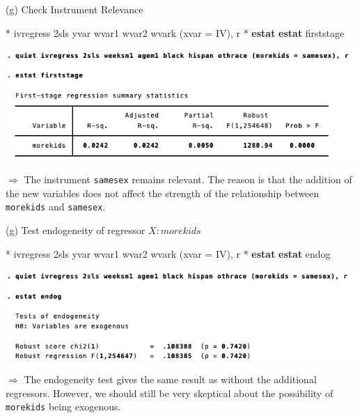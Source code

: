 \documentclass[
  10pt,
  ignorenonframetext,
]{beamer}
\newenvironment{Shaded}{\begin{snugshade}}{\end{snugshade}}
\newcommand{\FunctionTok}[1]{\textcolor[rgb]{0.00,0.00,0.00}{#1}}
\newcommand{\KeywordTok}[1]{\textcolor[rgb]{0.13,0.29,0.53}{\textbf{#1}}}
\newcommand{\NormalTok}[1]{#1}
\begin{document}
\begin{frame}[fragile]{(g) Check Instrument Relevance}
\protect\hypertarget{g-check-instrument-relevance}{}
\small

\begin{Shaded}
\begin{Highlighting}[]
\NormalTok{* ivregress 2sls yvar wvar1 wvar2 wvark (xvar = IV), }\FunctionTok{r}
\NormalTok{* }\KeywordTok{estat} \KeywordTok{estat}\NormalTok{ firststage}
\end{Highlighting}
\end{Shaded}

\begin{center}\includegraphics[width=0.9\linewidth]{pictures/res7-estatFirstStage2SLS} \end{center}

\(\Rightarrow\) The instrument \texttt{samesex} remains relevant. The
reason is that the addition of the new variables does not affect the
strength of the relationship between \texttt{morekids} and
\texttt{samesex}.
\end{frame}

\begin{frame}[fragile]{(g) Test endogeneity of regressor \(X:morekids\)}
\protect\hypertarget{g-test-endogeneity-of-regressor-xmorekids}{}
\small

\begin{Shaded}
\begin{Highlighting}[]
\NormalTok{* ivregress 2sls yvar wvar1 wvar2 wvark (xvar = IV), }\FunctionTok{r}
\NormalTok{* }\KeywordTok{estat} \KeywordTok{estat}\NormalTok{ endog}
\end{Highlighting}
\end{Shaded}

\begin{center}\includegraphics[width=0.9\linewidth]{pictures/res8-estatEndog2SLS} \end{center}

\(\Rightarrow\) The endogeneity test gives the same result as without
the additional regressors. However, we should still be very skeptical
about the possibility of \texttt{morekids} being exogenous.
\end{frame}
\end{document}
